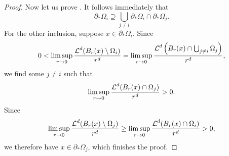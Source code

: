 \begin{proof}
	Now let us prove . It follows immediately that  
	\begin{equation*}
		\partial_{ \ast } \Omega_{ i }
		\supseteq
		\bigcup_{ j \neq i }
		\partial_{ \ast } \Omega_{ i }
		\cap
		\partial_{ \ast } \Omega_{ j }.
	\end{equation*}
	For the other inclusion, suppose $ x \in \partial_{ \ast } \Omega_{ i } $. Since
	\begin{equation*}
		0 <
		\limsup_{ r \to 0 }
		\frac{ \operatorname{\mathcal{L}}^{ d } ( B_{ r } ( x ) \setminus \Omega_{ i }) }{r^{ d } }
		=
		\limsup_{ r \to 0 } \frac{ \operatorname{\mathcal{L}}^{ d } \left( B_{ r } ( x ) \cap \bigcup_{ j \neq i } \Omega_{ j } \right) }{ r^{ d } },
	\end{equation*}
	we find some $ j \neq i $ such that
	\begin{equation*}
		\limsup_{ r \to 0 } \frac{ \operatorname{\mathcal{L}}^{ d } ( B_{ r } ( x ) \cap \Omega_{ j } ) }{ r^{ d } } > 0.
	\end{equation*}
	Since
	\begin{equation*}
		\limsup_{ r \to 0 } \frac{ \operatorname{\mathcal{L}}^{ d } ( B_{ r } ( x ) \setminus \Omega_{ j } ) }{ r^{ d } } 
		\geq
		\limsup_{ r \to 0 } \frac{ \operatorname{\mathcal{L}}^{ d } ( B_{ r } ( x ) \cap \Omega_{ i } ) }{ r^{ d } } > 0,
	\end{equation*}
	we therefore have $ x \in \partial_{ \ast } \Omega_{ j } $, which finishes the proof.
\end{proof}

